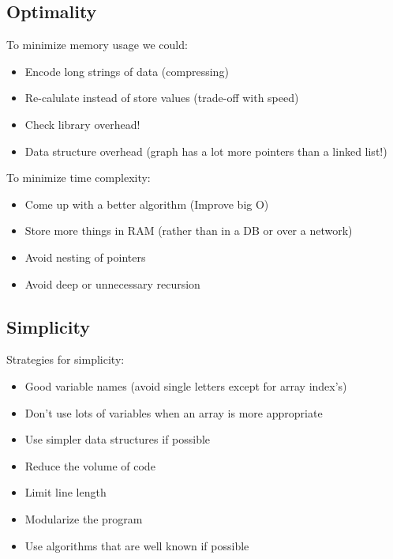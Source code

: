 \documentclass[12pt]{article}
\theoremstyle{definition}
\begin{document}
\subsection{Optimality}
To minimize memory usage we could:
\begin{itemize}
	\item Encode long strings of data (compressing)
	\item Re-calulate instead of store values (trade-off with speed)
	\item Check library overhead!
	\item Data structure overhead (graph has a lot more pointers than a linked list!)
\end{itemize}
To minimize time complexity:
\begin{itemize}
	\item Come up with a better algorithm (Improve big O)
	\item Store more things in RAM (rather than in a DB or over a network)
	\item Avoid nesting of pointers
	\item Avoid deep or unnecessary recursion 
\end{itemize}
\subsection{Simplicity}
Strategies for simplicity:
\begin{itemize}
	\item Good variable names (avoid single letters except for array index's)
	\item Don't use lots of variables when an array is more appropriate
	\item Use simpler data structures if possible
	\item Reduce the volume of code
	\item Limit line length
	\item Modularize the program
	\item Use algorithms that are well known if possible
\end{itemize}
\end{document}
